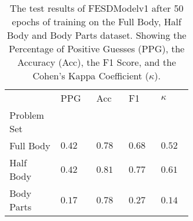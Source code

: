     \begin{table}[!htbp]
        \caption[Test Results of FESDModelv1]{The test results of FESDModelv1 after 50 epochs of training on the Full Body, Half Body and Body Parts dataset. Showing the Percentage of Positive Guesses (PPG), the Accuracy (Acc), the F1 Score, and the Cohen's Kappa Coefficient ($\kappa$).}
        \label{tab:res_v1}
        \centering
        \begin{tabular}{p{0.14\linewidth}p{0.12\linewidth}p{0.12\linewidth}p{0.12\linewidth}p{0.12\linewidth}}
\hline
{} &   PPG &  Acc &   F1 &    $\kappa$ \\
Problem Set   &       &          &      &           \\
\hline 
Full Body   & $0.42$ &	$0.78$ &	$0.68$ &	$0.52$ \\
Half Body   & $0.42$ &	$0.81$ &	$0.77$ &	$0.61$ \\
Body Parts  & $0.17$ &	$0.78$ &	$0.27$ &	$0.14$ \\

\hline
\end{tabular}

    \end{table}
